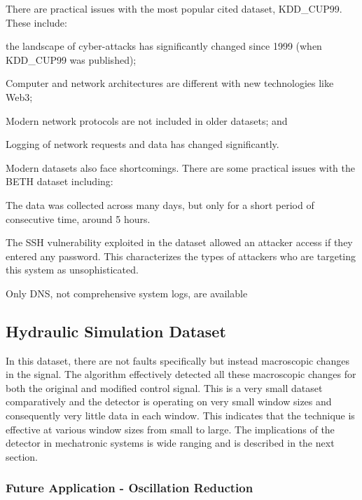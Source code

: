 There are practical issues with the most popular cited dataset, KDD\_CUP99. These include:
\begin{inlinelist}
    \item the landscape of cyber-attacks has significantly changed since 1999 (when KDD\_CUP99 was published);
    \item Computer and network architectures are different with new technologies like Web3;
    \item Modern network protocols are not included in older datasets; and
    \item Logging of network requests and data has changed significantly.
\end{inlinelist}

Modern datasets also face shortcomings. There are some practical issues with the BETH dataset including:
\begin{inlinelist}
    \item The data was collected across many days, but only for a short period of consecutive time, around 5 hours.
    \item The SSH vulnerability exploited in the dataset allowed an attacker access if they entered any password. This characterizes the types of attackers who are targeting this system as unsophisticated.
    \item Only DNS, not comprehensive system logs, are available
\end{inlinelist}

\subsection{Hydraulic Simulation Dataset}

In this dataset, there are not faults specifically but instead macroscopic changes in the signal. The algorithm effectively detected all these macroscopic changes for both the original and modified control signal. This is a very small dataset comparatively and the detector is operating on very small window sizes and consequently very little data in each window. This indicates that the technique is effective at various window sizes from small to large. The implications of the detector in mechatronic systems is wide ranging and is described in the next section.


\subsubsection{Future Application - Oscillation Reduction}


